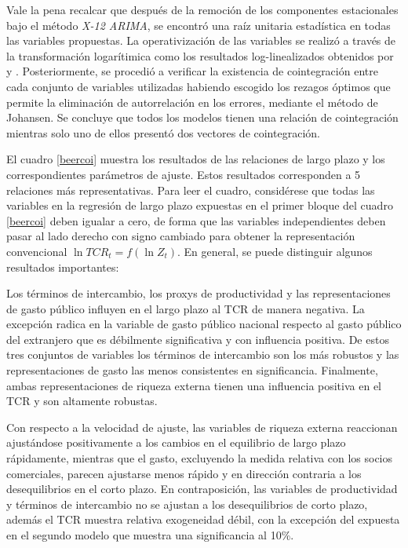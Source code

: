 \documentclass[12pt,letterpaper]{article}
\begin{document}
Vale la pena recalcar que después de la remoción de los componentes estacionales bajo el método \emph{X-12 ARIMA}, se encontró una raíz unitaria estadística en todas las variables propuestas. La operativización de las variables se realizó a través de la transformación logarítimica como los resultados log-linealizados obtenidos por \cite{lane2004trans} y \cite{Obstfeld1995dynamics}. Posteriormente, se procedió a verificar la existencia de cointegración entre cada conjunto de variables utilizadas habiendo escogido los rezagos óptimos que permite la eliminación de autorrelación en los errores, mediante el método de Johansen. Se concluye que todos los modelos tienen una relación de cointegración mientras solo uno de ellos presentó dos vectores de cointegración.

El cuadro \ref{beercoi} muestra los resultados de las relaciones de largo plazo y los correspondientes parámetros de ajuste. Estos resultados corresponden a 5 relaciones más representativas. Para leer el cuadro, considérese que todas las variables en la regresión de largo plazo expuestas en el primer bloque del cuadro \ref{beercoi} deben igualar a cero, de forma que las variables independientes deben pasar al lado derecho con signo cambiado para obtener la representación convencional $\ln TCR_t=f(\ln Z_t)$. En general, se puede distinguir algunos resultados importantes:

Los términos de intercambio, los proxys de productividad y las representaciones de gasto público influyen en el largo plazo al TCR de manera negativa. La excepción radica en la variable de gasto público nacional respecto al gasto público del extranjero que es débilmente significativa y con influencia positiva. De estos tres conjuntos de variables los términos de intercambio son los más robustos y las representaciones de gasto las menos consistentes en significancia. Finalmente, ambas representaciones de riqueza externa tienen una influencia positiva en el TCR y son altamente robustas.

Con respecto a la velocidad de ajuste, las variables de riqueza externa reaccionan ajustándose positivamente a los cambios en el equilibrio de largo plazo rápidamente, mientras que el gasto, excluyendo la medida relativa con los socios comerciales, parecen ajustarse menos rápido y en dirección contraria a los desequilibrios en el corto plazo. En contraposición, las variables de productividad y términos de intercambio no se ajustan a los desequilibrios de corto plazo, además el TCR muestra relativa exogeneidad débil, con la excepción del expuesta en el segundo modelo que muestra una significancia al 10\%.
\end{document}
